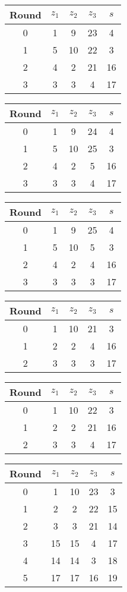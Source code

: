 \begin{tabular}{c | c | c | c | c }
Round & $z_1$ & $z_2$ & $z_3$ & $s$ \\
\hline
0 & 1 & 9 & 23 & 4 \\
1 & 5 & 10 & 22 & 3 \\
2 & 4 & 2 & 21 & 16 \\
3 & 3 & 3 & 4 & 17
\end{tabular}

\begin{tabular}{c | c | c | c | c }
Round & $z_1$ & $z_2$ & $z_3$ & $s$ \\
\hline
0 & 1 & 9 & 24 & 4 \\
1 & 5 & 10 & 25 & 3 \\
2 & 4 & 2 & 5 & 16 \\
3 & 3 & 3 & 4 & 17
\end{tabular}

\begin{tabular}{c | c | c | c | c }
Round & $z_1$ & $z_2$ & $z_3$ & $s$ \\
\hline
0 & 1 & 9 & 25 & 4 \\
1 & 5 & 10 & 5 & 3 \\
2 & 4 & 2 & 4 & 16 \\
3 & 3 & 3 & 3 & 17
\end{tabular}

\begin{tabular}{c | c | c | c | c }
Round & $z_1$ & $z_2$ & $z_3$ & $s$ \\
\hline
0 & 1 & 10 & 21 & 3 \\
1 & 2 & 2 & 4 & 16 \\
2 & 3 & 3 & 3 & 17
\end{tabular}

\begin{tabular}{c | c | c | c | c }
Round & $z_1$ & $z_2$ & $z_3$ & $s$ \\
\hline
0 & 1 & 10 & 22 & 3 \\
1 & 2 & 2 & 21 & 16 \\
2 & 3 & 3 & 4 & 17
\end{tabular}

\begin{tabular}{c | c | c | c | c }
Round & $z_1$ & $z_2$ & $z_3$ & $s$ \\
\hline
0 & 1 & 10 & 23 & 3 \\
1 & 2 & 2 & 22 & 15 \\
2 & 3 & 3 & 21 & 14 \\
3 & 15 & 15 & 4 & 17 \\
4 & 14 & 14 & 3 & 18 \\
5 & 17 & 17 & 16 & 19
\end{tabular}

